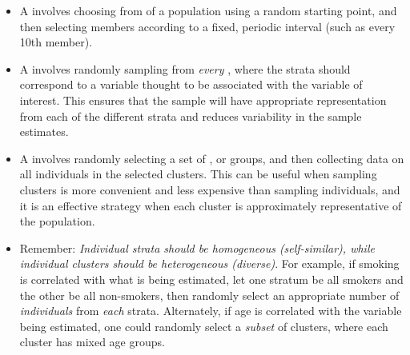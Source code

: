 \begin{itemize}
\item A  involves choosing from of a population using a random starting point, and then selecting members according to a fixed, periodic interval (such as every 10th member). 

\item A  involves randomly sampling from \textit{every} , where the strata should correspond to a variable thought to be associated with the variable of interest.  This ensures that the sample will have appropriate representation from each of the different strata and reduces variability in the sample estimates.

\item A  involves randomly selecting a set of , or groups, and then collecting data on all individuals in the selected clusters. This can be useful when sampling clusters is more convenient and less expensive than sampling individuals, and it is an effective strategy when each cluster is approximately representative of the population.  

\item Remember:  \textit{Individual strata should be homogeneous (self-similar), while individual clusters should be heterogeneous (diverse)}.  For example, if smoking is correlated with what is being estimated, let one stratum be all smokers and the other be all non-smokers, then randomly select an appropriate number of \textit{individuals} from \textit{each} strata.  Alternately, if age is correlated with the variable being estimated, one could randomly select a \textit{subset} of clusters, where each cluster has mixed age groups.


\end{itemize}

{}


